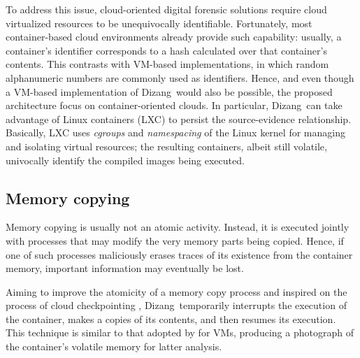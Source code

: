 \documentclass[10pt,journal,compsoc]{IEEEtran}
\newcommand{\fancyname}{Dizang}
\begin{document}
To address this issue, cloud-oriented digital forensic solutions require cloud virtualized resources to be unequivocally identifiable.
%
Fortunately, most container-based cloud environments already provide such capability: usually, a container's identifier corresponds to a hash calculated over that container's contents.
%
This contrasts with VM-based implementations, in which random alphanumeric numbers are commonly used as identifiers.
%
Hence, and even though a VM-based implementation of \fancyname\ would also be possible, the proposed architecture focus on container-oriented clouds.
%
In particular, \fancyname\ can take advantage of Linux containers (LXC) to persist the source-evidence relationship.
%
Basically, LXC uses \textit{cgroups} and \textit{namespacing} of the Linux kernel for managing and isolating virtual resources; the resulting containers, albeit still volatile, univocally identify the compiled images being executed.
%
%

\subsection{Memory copying}
\label{sec:proposal-desc-memcpy}

Memory copying is usually not an atomic activity.
%
Instead, it is executed jointly with processes that may modify the very memory parts being copied.
%
Hence, if one of such processes maliciously erases traces of its existence from the container memory, important information may eventually be lost.


Aiming to improve the atomicity of a memory copy process and inspired on the process of cloud checkpointing \cite{cloud_checkpointing_2015}, 
%
\fancyname\ temporarily interrupts the execution of the container, makes a copies of its contents, and then resumes its execution. 
%
This technique is similar to that adopted by \cite{Rafique_Static_Live_Digital_Forensics:2013} for VMs, producing a photograph of the container's volatile memory for latter analysis.
\end{document}
